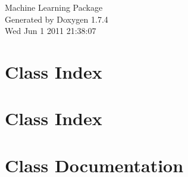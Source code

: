 \documentclass[a4paper]{book}
\begin{document}
\hypersetup{pageanchor=false}
\begin{titlepage}
\vspace*{7cm}
\begin{center}
{\Large Machine Learning Package }\\
\vspace*{1cm}
{\large Generated by Doxygen 1.7.4}\\
\vspace*{0.5cm}
{\small Wed Jun 1 2011 21:38:07}\\
\end{center}
\end{titlepage}
\clearemptydoublepage
{}
\tableofcontents
\clearemptydoublepage
{}
\hypersetup{pageanchor=true}
\chapter{Class Index}

\chapter{Class Index}

\chapter{Class Documentation}





















\printindex
\end{document}

